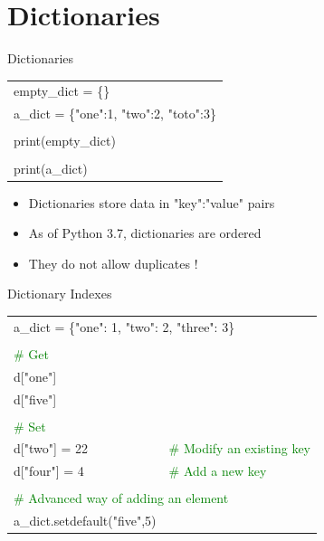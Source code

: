 \documentclass[serif, aspectratio=169]{beamer}
\newcommand{\tgreen}[1]{\textcolor{green}{#1}}
\newenvironment{CLI} %
    {
    \noindent
    \ttfamily 
    \footnotesize
    \begin{tcolorbox}[colback=gray!150,colframe=black]
    \color{white}
    \begin{tabular}{p{4.5cm}p{7.5cm}}
    }
    { 
    \end{tabular}
    \end{tcolorbox}
    }
\begin{document}
\section{Dictionaries}

\begin{frame}{Dictionaries}
    \begin{CLI}
        empty\_dict = \{\} & \\
        \multicolumn{2}{l}{a\_dict = \{"one":1, "two":2, "toto":3\}} \\
        & \\
        print(empty\_dict) & \\
        & \\
        print(a\_dict) & \\
    \end{CLI}
    \begin{block}{}
        \begin{itemize}
            \item Dictionaries store data in "key":"value" pairs 
            \item As of Python 3.7, dictionaries are ordered
            \item They do not allow duplicates !
        \end{itemize}
    \end{block}
\end{frame}

\begin{frame}{Dictionary Indexes}
    \begin{CLI}
        \multicolumn{2}{l}{a\_dict = \{"one": 1, "two": 2, "three": 3\}} \\
        & \\
        \tgreen{\# Get} & \\
        d["one"] & \\%
        d["five"] & \\%
        & \\
        \tgreen{\# Set} & \\
        d["two"] = 22 & \tgreen{\# Modify an existing key} \\
        d["four"] = 4 & \tgreen{\# Add a new key} \\
        & \\
        \multicolumn{2}{l}{\tgreen{\# Advanced way of adding an element}} \\
        a\_dict.setdefault("five",5) & \\
    \end{CLI}
\end{frame}
\end{document}
